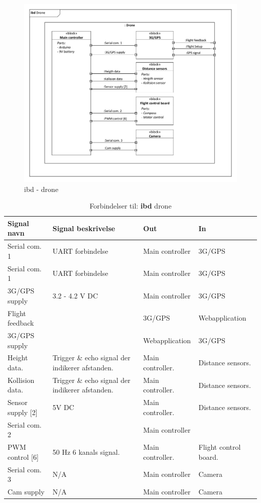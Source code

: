

\begin{figure}[H]
\centering
\includegraphics[width=1\textwidth]{Billeder/IBD/ibd2_drone.pdf}
\caption{ibd - drone}
\label{fig:ibd_drone}
\end{figure}

\begin{table}[H]
	\centering
		\begin{tabular}{|p{2.5 cm}|p{5.5 cm}|p{2.5 cm}|p{2.5 cm}|} 
		\hline
			\textbf{Signal navn} 	& \textbf{Signal beskrivelse}		& \textbf{Out} 				& \textbf{In}     \\ \hline
			Serial com. 1		& UART forbindelse & Main controller & 3G/GPS    \\ \hline
			Serial com. 1		& UART forbindelse & Main controller & 3G/GPS    \\ \hline
			3G/GPS supply 		& 3.2 - 4.2 V DC	& Main controller				& 3G/GPS	\\ \hline
			Flight feedback	& & 3G/GPS	& Webapplication	\\ \hline
			
			3G/GPS supply 		& 	& Webapplication				& 3G/GPS	\\ \hline
			Height data.		& Trigger \& echo signal der indikerer afstanden. 	& Main controller.	& Distance sensors.	\\ \hline
			Kollision data.		& Trigger \& echo signal der indikerer afstanden. 	& Main controller.	& Distance sensors.  \\ \hline
			Sensor supply [2]	& 5V DC	& Main controller. & Distance sensors.	\\ \hline
			Serial com. 2		& 	& Main controller				& 	\\ \hline 
			PWM control [6]		& 50 Hz 6 kanals signal.	& Main controller.				& Flight control board.	\\ \hline
			Serial com. 3		& N/A	& Main controller	& Camera	\\ \hline
			Cam supply			& N/A 	& Main controller	& Camera	\\ \hline 
		\end{tabular}
	\caption{Forbindelser til: \textbf{ibd} drone}
	\label{tab:ibddrone}
\end{table}

